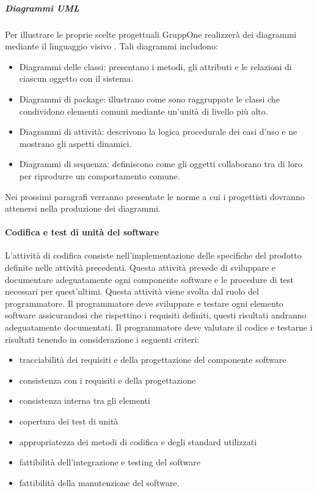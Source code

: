 \documentclass[../../norme-di-progetto.tex]{subfiles}
\begin{document}
\subparagraph{Diagrammi UML}%
\label{subp:diagrammi_UML}
Per illustrare le proprie scelte progettuali GruppOne realizzerà dei diagrammi mediante il linguaggio visivo .
Tali diagrammi includono:
\begin{itemize}
  \item Diagrammi delle classi: presentano i metodi, gli attributi e le relazioni di ciascun oggetto con il sistema.
  \item Diagrammi di package: illustrano come sono raggruppate le classi che condividono elementi comuni mediante un'unità di livello più alto.
  \item Diagrammi di attività: descrivono la logica procedurale dei casi d'uso e ne mostrano gli aspetti dinamici.
  \item Diagrammi di sequenza: definiscono come gli oggetti collaborano tra di loro per riprodurre un comportamento comune.
\end{itemize}
Nei prossimi paragrafi verranno presentate le norme a cui i progettisti dovranno attenersi nella produzione dei diagrammi.

\paragraph{Codifica e test di unità del software}%
\label{par:codifica_test_software}
L'attività di codifica consiste nell'implementazione delle specifiche del prodotto definite nelle attività precedenti.
Questa attività prevede di sviluppare e documentare adeguatamente ogni componente software e le procedure di test necessari per quest'ultimi.
Questa attività viene svolta dal ruolo del programmatore.
Il programmatore deve sviluppare e testare ogni elemento software assicurandosi che rispettino i requisiti definiti, questi risultati andranno adeguatamente documentati.
Il programmatore deve valutare il codice e testarne i risultati tenendo in considerazione i seguenti criteri:
\begin{itemize}
    \item tracciabilità dei requisiti e della progettazione del componente software
    \item consistenza con i requisiti e della progettazione
    \item consistenza interna tra gli elementi
    \item copertura dei test di unità
    \item appropriatezza dei metodi di codifica e degli standard utilizzati
    \item fattibilità dell'integrazione e testing del software
    \item fattibilità della manutenzione del software.
\end{itemize}
\end{document}
